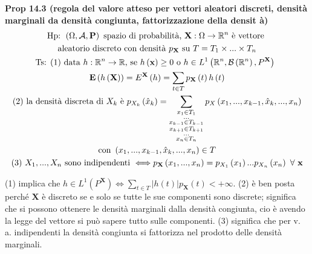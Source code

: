 \documentclass{article}
\begin{document}
\textbf{Prop 14.3 (regola del valore atteso per vettori aleatori discreti,
densit\`{a} marginali da densit\`{a} congiunta, fattorizzazione della densit%
\`{a})} 
\begin{gather*}
\text{Hp: }\left( \Omega ,\mathcal{A},\mathbf{P}\right) \text{ spazio di
probabilit\`{a}, }\mathbf{X}:\Omega \rightarrow 
\mathbb{R}
^{n}\text{ \`{e} vettore } \\
\text{aleatorio discreto con densit\`{a} }p_{\mathbf{X}}\text{ su }%
T=T_{1}\times ...\times T_{n} \\
\text{Ts: (1) data }h:%
\mathbb{R}
^{n}\rightarrow 
\mathbb{R}
\text{, se }h\left( \mathbf{x}\right) \geq 0\text{ o }h\in L^{1}\left( 
\mathbb{R}
^{n},\mathcal{B}\left( 
\mathbb{R}
^{n}\right) ,P^{\mathbf{X}}\right) \text{ } \\
\mathbf{E}\left( h\left( \mathbf{X}\right) \right) =E^{\mathbf{X}}\left(
h\right) =\sum_{t\in T}p_{\mathbf{X}}\left( t\right) h\left( t\right) \\
\text{(2) la densit\`{a} discreta di }X_{k}\text{ \`{e} }p_{X_{k}}\left( 
\hat{x}_{k}\right) =\sum_{\substack{ x_{1}\in T_{1}  \\ ...  \\ x_{k-1}\in
T_{k-1}  \\ x_{k+1}\in T_{k+1}  \\ ...  \\ x_{n}\in T_{n}}}p_{X}\left(
x_{1},...,x_{k-1},\hat{x}_{k},...,x_{n}\right) \\
\text{con }\left( x_{1},...,x_{k-1},\hat{x}_{k},...,x_{n}\right) \in T \\
\text{(3) }X_{1},...,X_{n}\text{ sono indipendenti }\Longleftrightarrow p_{%
\mathbf{X}}\left( x_{1},...,x_{n}\right) =p_{X_{1}}\left( x_{1}\right)
...p_{X_{n}}\left( x_{n}\right) \text{ }\forall \text{ }\mathbf{x}
\end{gather*}

(1) implica che $h\in L^{1}\left( P^{\mathbf{X}}\right) \Longleftrightarrow
\sum_{t\in T}\left\vert h\left( t\right) \right\vert p_{\mathbf{X}}\left(
t\right) <+\infty $. (2) \`{e} ben posta perch\'{e} $\mathbf{X}$ \`{e}
discreto se e solo se tutte le sue componenti sono discrete; significa che
si possono ottenere le densit\`{a} marginali dalla densit\`{a} congiunta, cio%
\`{e} avendo la legge del vettore si pu\`{o} sapere tutto sulle componenti.
(3) significa che per v. a. indipendenti la densit\`{a} congiunta si
fattorizza nel prodotto delle densit\`{a} marginali.
\end{document}
